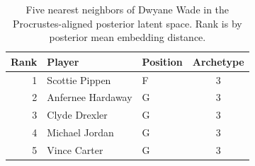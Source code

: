 \begin{table}[htbp]
  \centering\small
  \begin{tabular}{rllc}
    \toprule
    Rank & Player & Position & Archetype \\
    \midrule
    1 & Scottie Pippen & F & 3 \\
    2 & Anfernee Hardaway & G & 3 \\
    3 & Clyde Drexler & G & 3 \\
    4 & Michael Jordan & G & 3 \\
    5 & Vince Carter & G & 3 \\
    \bottomrule
  \end{tabular}
  \caption{Five nearest neighbors of Dwyane Wade in the Procrustes-aligned posterior latent space. Rank is by posterior mean embedding distance.}
  \label{tab:Dwyane_Wade_neighbors}
\end{table}

